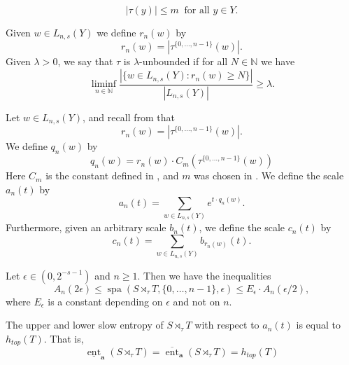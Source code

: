 \documentclass[10pt,a4paper]{amsart}
\newcommand{\N}{\mathbb{N}}
\newcommand{\lowerent}{\underline{\operatorname{ent}}}
\newcommand{\spa}{\operatorname{spa}}
\newcommand{\upperent}{\overline{\operatorname{ent}}}
\begin{document}
\begin{equation}\label{constant-m}|\tau(y)|\leq m \ \text{ for all } y\in Y.\end{equation}

\begin{definition}\label{def:good}\label{lambda-unbounded}
    Given $w\in L_{n,s}(Y)$ we define $r_n(w)$ by 
    \[r_n(w)=|\tau^{\{0,\dots,n-1\}}(w)|.\]
    Given $\lambda>0$, we say that $\tau$ is $\lambda$-unbounded if for
    all $N\in\N$ we have
\[\liminf_{n\in\N}\frac{|\{w\in L_{n,s}(Y) : r_n(w)\geq N\}|}{|L_{n,s}(Y)|}\geq \lambda.\]
\end{definition}

\begin{definition}\label{def:scales}
Let $w\in L_{n,s}(Y)$, and recall from  that
\[r_n(w)= |\tau^{\{0,\dots,n-1\}}(w)|.\]
We define $q_n(w)$ by 
\[q_n(w)=r_n(w)\cdot C_m(\tau^{\{0,\dots,n-1\}}(w))\]
Here $C_m$ is the constant defined in , and $m$ was chosen in . We define the scale $a_n(t)$ by
\[a_n(t)=\sum_{w\in L_{n,s}(Y)}e^{t\cdot q_n(w)}.\]
Furthermore, given an arbitrary scale $b_n(t)$, we define the scale $c_n(t)$ by 
\[c_n(t)=\sum_{w\in L_{n,s}(Y)}b_{r_n(w)}(t).\]
\end{definition}

\begin{proposition}\label{prop:the-set-A}
    Let $\epsilon\in (0,2^{-s-1})$ and $n\geq 1$. Then we have the inequalities
    \[A_n(2\epsilon)\leq \spa(S\rtimes_\tau T,\{0,\dots,n-1\},\epsilon)\leq E_{\epsilon}\cdot  A_n(\epsilon/2),\]
    where $E_{\epsilon}$ is a constant depending on $\epsilon$ and not on $n$.
\end{proposition}

\begin{proposition}\label{prop:entropy}
The upper and lower slow entropy of $S\rtimes_\tau T$ with respect to $a_n(t)$ is equal to $h_{top}(T)$. That is,
\[\lowerent_{\textbf{a}}(S\rtimes_\tau T)=\upperent_{\textbf{a}}(S\rtimes_\tau T)=h_{top}(T)\]
\end{proposition}
\end{document}
